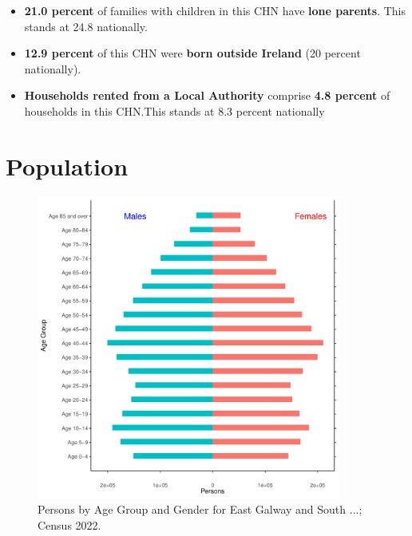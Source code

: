 \documentclass{article}
\begin{document}
\begin{itemize}
\item \textbf{21.0 percent} of families with children in this CHN have \textbf{lone parents}. This stands at 24.8 nationally.

\item \textbf{12.9 percent} of this CHN were \textbf{born outside Ireland} (20 percent nationally).

\item \textbf{Households rented from a Local Authority} comprise \textbf{4.8 percent} of households in this CHN.This stands at 8.3 percent nationally

\end{itemize}

\pagebreak

\section{Population} 
\label{sect:Pop}

\begin{figure}[h]
	\centering
	\includegraphics[width = 100mm]{../figures/PyramidPlot.pdf}
	\caption{Persons by Age Group and Gender for East Galway and South ...; Census 2022.}
	\label{fig:2ae19629-1a6a-13a3-e055-000000000001}
	\end{figure}
\end{document}
